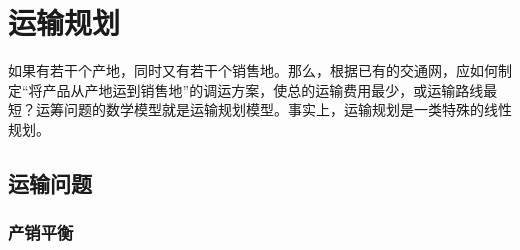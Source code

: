 \ifx\allfiles\undefined

	
	
\else
\fi

    \chapter{运输规划}
    如果有若干个产地，同时又有若干个销售地。那么，根据已有的交通网，应如何制定“将产品从产地运到销售地”的调运方案，使总的运输费用最少，或运输路线最短？运筹问题的数学模型就是运输规划模型。事实上，运输规划是一类特殊的线性规划。
    \section{运输问题}
    \subsection{产销平衡}
